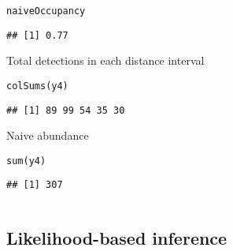 \documentclass[color=usenames,dvipsnames]{beamer}\usepackage[]{graphicx}\usepackage[]{xcolor}
\makeatletter
\newcommand{\hlstd}[1]{\textcolor[rgb]{0,0,0}{#1}}%
\newcommand{\hlkwd}[1]{\textcolor[rgb]{0.004,0.004,0.506}{#1}}%
\newenvironment{kframe}{%
 \def\at@end@of@kframe{}%
 \ifinner\ifhmode%
  \def\at@end@of@kframe{\end{minipage}}%
  \begin{minipage}{\columnwidth}%
 \fi\fi%
 \def\FrameCommand##1{\hskip\@totalleftmargin \hskip-\fboxsep
 \colorbox{shadecolor}{##1}\hskip-\fboxsep
     \hskip-\linewidth \hskip-\@totalleftmargin \hskip\columnwidth}%
 \MakeFramed {\advance\hsize-\width
   \@totalleftmargin\z@ \linewidth\hsize
   \@setminipage}}%
 {\par\unskip\endMakeFramed%
 \at@end@of@kframe}
\newenvironment{knitrout}{}{} %
\makeatother
\begin{document}
\begin{frame}[fragile]
\begin{columns}
\begin{column}{0.6\textwidth}
\begin{knitrout}
\begin{kframe}
\begin{alltt}
\hlstd{naiveOccupancy}
\end{alltt}
\begin{verbatim}
## [1] 0.77
\end{verbatim}
\end{kframe}
\end{knitrout}
  \pause
  \vfill
  \small
  Total detections in each distance interval
  \vspace{-6pt}
\begin{knitrout}\scriptsize
{}\color{fgcolor}\begin{kframe}
\begin{alltt}
\hlkwd{colSums}\hlstd{(y4)}
\end{alltt}
\begin{verbatim}
## [1] 89 99 54 35 30
\end{verbatim}
\end{kframe}
\end{knitrout}
  \pause
  \vfill
  Naive abundance
  \vspace{-6pt}
\begin{knitrout}\scriptsize
{}\color{fgcolor}\begin{kframe}
\begin{alltt}
\hlkwd{sum}\hlstd{(y4)}
\end{alltt}
\begin{verbatim}
## [1] 307
\end{verbatim}
\end{kframe}
\end{knitrout}
  \end{column}
  \end{columns}
\end{frame}






\subsection{Likelihood-based inference}
\end{document}
